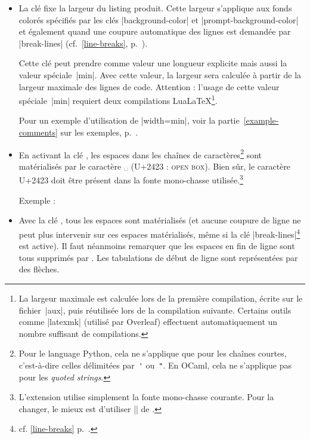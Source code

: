 \documentclass[dvipsnames,svgnames]{article}
\begin{document}
\begin{itemize}
\item {} La clé  fixe la largeur du listing produit. Cette largeur s'applique aux fonds colorés
spécifiés par les clés |background-color| et |prompt-background-color| et également quand une coupure automatique
des lignes est demandée par |break-lines| (cf.~\ref{line-breaks}, p.~\pageref{line-breaks}).

Cette clé peut prendre comme valeur une longueur explicite mais aussi la valeur spéciale~|min|. Avec cette valeur,
la largeur sera calculée à partir de la largeur maximale des lignes de code. Attention : l'usage de cette valeur
spéciale~|min| requiert deux compilations LuaLaTeX\footnote{La largeur maximale est calculée lors de la première
compilation, écrite sur le fichier~|aux|, puis réutilisée lors de la compilation suivante. Certains outils comme
|latexmk| (utilisé par Overleaf) effectuent automatiquement un nombre suffisant de compilations.}.

Pour un exemple d'utilisation de |width=min|, voir la partie~\ref{example-comments} sur les exemples, p.~\pageref{example-comments}.

\item {} En activant la clé , les espaces dans les
chaînes de caractères\footnote{Pour le language Python, cela ne s'applique que pour les chaînes courtes, c'est-à-dire
celles délimitées par~\verb|'| ou~\verb|"|. En OCaml, cela ne s'applique pas pour les \emph{quoted strings}.} sont
matérialisés par le caractère ␣ (U+2423 : \textsc{open box}). Bien sûr, le caractère U+2423 doit être présent dans la fonte mono-chasse utilisée.\footnote{L'extension  utilise
  simplement la fonte mono-chasse courante. Pour la changer, le mieux est d'utiliser |\setmonofont| de
  .}\par\nobreak
%
\begingroup
{}
Exemple : 
\endgroup

\item {} Avec la clé , tous les espaces sont matérialisés (et aucune
coupure de ligne ne peut plus intervenir sur ces espaces matérialisés, même si la clé |break-lines|\footnote{cf.
  \ref{line-breaks} p.~\pageref{line-breaks}.} est active). Il faut néanmoins remarquer que les espaces en fin de
ligne sont tous supprimés par . Les tabulations de début de ligne sont représentées par des flèches.
\end{itemize}
\end{document}
